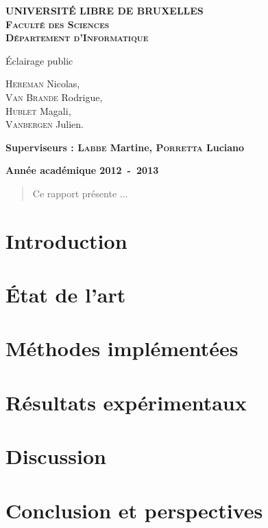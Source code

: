 \documentclass[a4paper,10pt]{report}
\begin{document}
\begin{titlepage}
\begin{center}
\textbf{\textsc{UNIVERSIT\'E LIBRE DE BRUXELLES}}\\
\textbf{\textsc{Faculté des Sciences}}\\
\textbf{\textsc{Département d'Informatique}}
\vfill{}\vfill{}
\begin{center}{\Huge \'Eclairage public}\end{center}{\Huge \par}
\begin{center}{\large \textsc{Hereman} Nicolas,\\\textsc{Van Brande} Rodrigue,\\\textsc{Hublet} Magali,\\\textsc{Vanbergen} Julien.}\end{center}{\Huge \par}
\vfill{}\vfill{}
\begin{flushleft}{\large \textbf{Superviseurs : \textsc{Labbe} Martine, \textsc{Porretta} Luciano}}\hfill{}\end{flushleft}{\large\par}
\vfill{}\vfill{}\enlargethispage{3cm}
\textbf{Année académique 2012~-~2013}
\end{center}
\end{titlepage}

\begin{abstract}
Ce rapport présente ...
\end{abstract}


\tableofcontents

\chapter{Introduction}


\chapter{État de l'art}


\chapter{Méthodes implémentées}


\chapter{Résultats expérimentaux}


\chapter{Discussion}


\chapter{Conclusion et perspectives}




%
\end{document}
